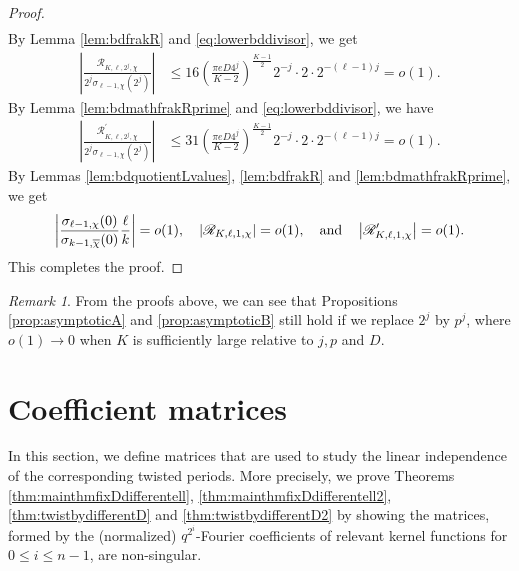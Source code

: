\documentclass[11pt,letterpaper,reqno]{amsart}
\numberwithin{figure}{section}
\numberwithin{table}{section}
\theoremstyle{definition}
\theoremstyle{plain}
\theoremstyle{definition}
\theoremstyle{definition}
\theoremstyle{remark}
\newtheorem{remark}{Remark}[section]
\numberwithin{equation}{section}
\theoremstyle{remark}
\begin{document}
\begin{proof}
\begin{align*}
\end{align*}
By Lemma \ref{lem:bdfrakR} and \eqref{eq:lowerbddivisor}, we get
\begin{align*}
  \left|  \frac{\mathscr{R}_{K,\ell,2^j,\chi}}{2^j\sigma_{\ell-1,\chi}(2^{j})}\right|&\leq16\left(\frac{\pi eD4^j}{K-2}\right)^{\frac{K-1}{2}}2^{-j}\cdot 2\cdot 2^{-(\ell-1)j}=o(1).
\end{align*}
By Lemma \ref{lem:bdmathfrakRprime} and \eqref{eq:lowerbddivisor}, we have 
\begin{align*}
      \left|  \frac{\mathscr{R}_{K,\ell,2^j,\chi}^{\prime}}{2^j\sigma_{\ell-1,\chi}(2^{j})}\right|&\leq31\left(\frac{\pi eD4^j}{K-2}\right)^{\frac{K-1}{2}}2^{-j}\cdot 2\cdot 2^{-(\ell-1)j}=o(1).
\end{align*}
By Lemmas \ref{lem:bdquotientLvalues},  \ref{lem:bdfrakR} and \ref{lem:bdmathfrakRprime}, we get 
\begin{align}
   \left|\frac{\sigma_{\ell-1,\chi}(0)}{\sigma_{k-1,\overline{\chi}}(0)}\frac{\ell}{k}\right|=o(1),\quad\left|\mathscr{R}_{K,\ell,1,\chi}\right|=o(1),\quad{\rm and}\quad\left|\mathscr{R}^{\prime}_{K,\ell,1,\chi}\right|=o(1). 
\end{align}
This completes the proof.
\end{proof}
\begin{remark}
    From the proofs above, we can see that Propositions \ref{prop:asymptoticA} and \ref{prop:asymptoticB} still hold if we replace $2^j$ by $p^j$, where $o(1)\rightarrow0$ when $K$ is sufficiently large relative to $j,p$ and $D$.
\end{remark}
\section{Coefficient matrices}\label{sect:coefmatrix}
In this section, we define matrices that are used to study the linear independence of the corresponding twisted periods. More precisely, we prove Theorems \ref{thm:mainthmfixDdifferentell}, \ref{thm:mainthmfixDdifferentell2}, \ref{thm:twistbydifferentD} and \ref{thm:twistbydifferentD2} by showing the  matrices, formed by the (normalized) $q^{2^i}$-Fourier coefficients of relevant kernel functions for $0\le i\le n-1$, are non-singular. 
\end{document}
